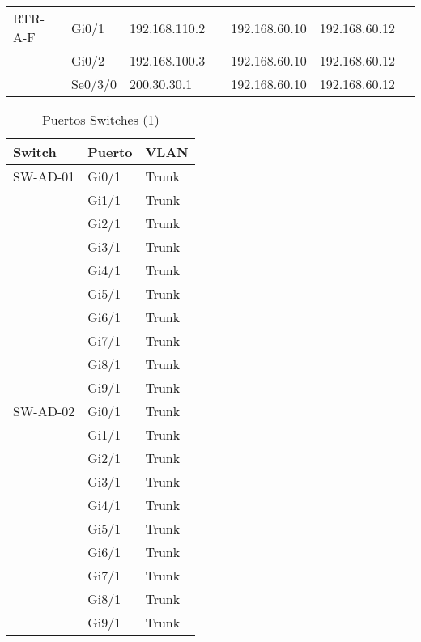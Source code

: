 \documentclass[a4paper,onecolumn,11pt]{article}
\begin{document}
\begin{table}[htbp]
\begin{center}
\begin{tabular}{p{}p{}p{}p{}p{}p{}p{}}
RTR-A-F  & Gi0/1 & 192.168.110.2 &  & 192.168.60.10 & 192.168.60.12 & \\
&Gi0/2   & 192.168.100.3 &  & 192.168.60.10 & 192.168.60.12 & \\
&Se0/3/0 & 200.30.30.1   &  & 192.168.60.10 & 192.168.60.12 & \\ 
\bottomrule
\end{tabular}
\end{center}
\label{tab:interfaces}
\end{table}

\begin{table}[htbp]
\small \sffamily
\caption{Puertos Switches (1)}
\begin{center}
\begin{tabular}{p{}p{}p{}}
\toprule
\textbf{Switch} & \textbf{Puerto} & \textbf{VLAN}  \\
\toprule
SW-AD-01 & Gi0/1 & Trunk \\ %
& Gi1/1 & Trunk  \\
& Gi2/1 & Trunk  \\
& Gi3/1 & Trunk  \\
& Gi4/1 & Trunk  \\
& Gi5/1 & Trunk  \\
& Gi6/1 & Trunk  \\
& Gi7/1 & Trunk  \\
& Gi8/1 & Trunk  \\
& Gi9/1 & Trunk  \\ \midrule
SW-AD-02 & Gi0/1 & Trunk \\ %
& Gi1/1 & Trunk  \\
& Gi2/1 & Trunk  \\
& Gi3/1 & Trunk  \\
& Gi4/1 & Trunk  \\
& Gi5/1 & Trunk  \\
& Gi6/1 & Trunk  \\
& Gi7/1 & Trunk  \\
& Gi8/1 & Trunk  \\
& Gi9/1 & Trunk  \\ 
\bottomrule
\end{tabular}
\end{center}
\label{tab:puertos1}
\end{table}
\end{document}
